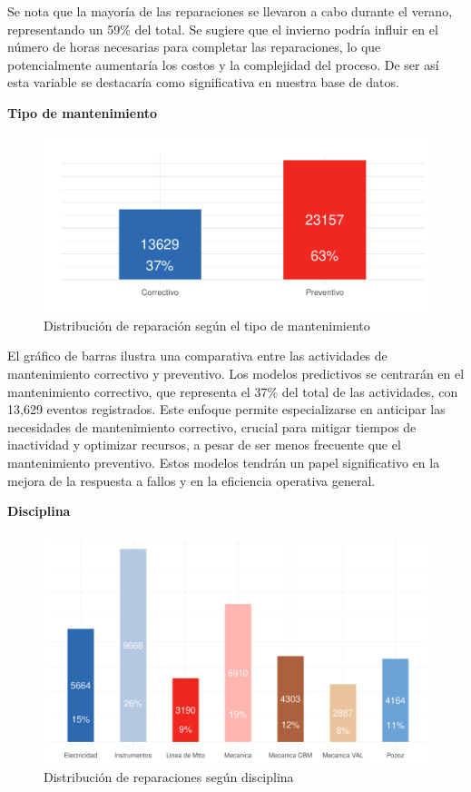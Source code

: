 \documentclass[
  11pt,
  bookmarksnumbered]{article}
\begin{document}
Se nota que la mayoría de las reparaciones se llevaron a cabo durante el verano, representando un 59\% del total.
Se sugiere que el invierno podría influir en el número de horas necesarias para completar las reparaciones, lo que potencialmente aumentaría los costos y la complejidad del proceso.
De ser así esta variable se destacaría como significativa en nuestra base de datos.

\newpage

\textbf{Tipo de mantenimiento}

\begin{figure}
\centering
\includegraphics{trabajo_files/figure-latex/unnamed-chunk-13-1.pdf}
\caption{\label{fig:unnamed-chunk-13}Distribución de reparación según el tipo de mantenimiento}
\end{figure}

El gráfico de barras ilustra una comparativa entre las actividades de mantenimiento correctivo y preventivo.
Los modelos predictivos se centrarán en el mantenimiento correctivo, que representa el 37\% del total de las actividades, con 13,629 eventos registrados.
Este enfoque permite especializarse en anticipar las necesidades de mantenimiento correctivo, crucial para mitigar tiempos de inactividad y optimizar recursos, a pesar de ser menos frecuente que el mantenimiento preventivo.
Estos modelos tendrán un papel significativo en la mejora de la respuesta a fallos y en la eficiencia operativa general.

\newpage

\textbf{Disciplina}

\begin{figure}
\centering
\includegraphics{trabajo_files/figure-latex/unnamed-chunk-14-1.pdf}
\caption{\label{fig:unnamed-chunk-14}Distribución de reparaciones según disciplina}
\end{figure}
\end{document}
